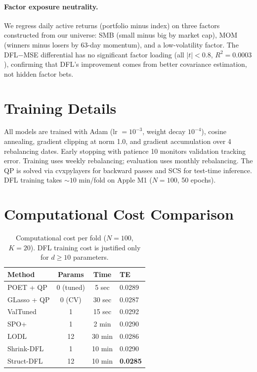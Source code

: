\documentclass[letterpaper]{article}
\begin{document}
\paragraph{Factor exposure neutrality.}
We regress daily active returns (portfolio minus index) on three factors constructed from our universe: SMB (small minus big by market cap), MOM (winners minus losers by 63-day momentum), and a low-volatility factor. The DFL$-$MSE differential has no significant factor loading (all $|t| < 0.8$, $R^2 = 0.0003$), confirming that DFL's improvement comes from better covariance estimation, not hidden factor bets.

\section{Training Details}
\label{app:training}

All models are trained with Adam (lr $= 10^{-3}$, weight decay $10^{-4}$), cosine annealing, gradient clipping at norm 1.0, and gradient accumulation over 4 rebalancing dates. Early stopping with patience 10 monitors validation tracking error. Training uses weekly rebalancing; evaluation uses monthly rebalancing. The QP is solved via cvxpylayers \citep{agrawal2019differentiable} for backward passes and SCS for test-time inference. DFL training takes ${\sim}10$ min/fold on Apple M1 ($N{=}100$, 50 epochs).

\section{Computational Cost Comparison}
\label{app:cost}

\begin{table}[h]
\centering
\caption{Computational cost per fold ($N{=}100$, $K{=}20$). DFL training cost is justified only for $d \geq 10$ parameters.}
\small
\begin{tabular}{@{}lccl@{}}
\toprule
Method & Params & Time & TE \\
\midrule
POET + QP     & 0 (tuned) & 5 sec & 0.0289 \\
GLasso + QP   & 0 (CV)    & 30 sec & 0.0287 \\
ValTuned      & 1         & 15 sec & 0.0292 \\
SPO+          & 1         & 2 min  & 0.0290 \\
LODL          & 12        & 30 min & 0.0286 \\
Shrink-DFL    & 1         & 10 min & 0.0290 \\
Struct-DFL    & 12        & 10 min & \textbf{0.0285} \\
\bottomrule
\end{tabular}
\end{table}
\end{document}
